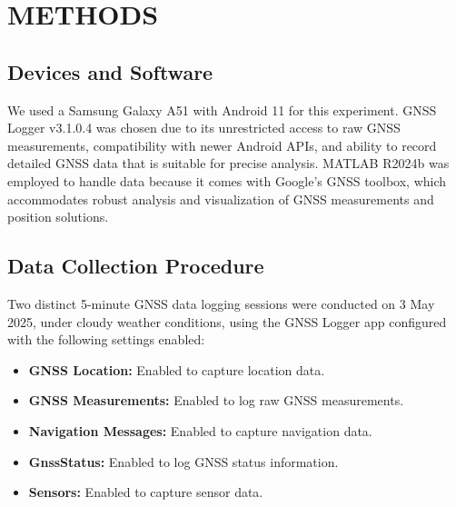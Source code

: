 
\section{METHODS} \label{sec:methods}


    \subsection{Devices and Software}
    
    We used a Samsung Galaxy A51 with Android 11 for this experiment.
    GNSS Logger v3.1.0.4 was chosen due to its unrestricted access to raw GNSS measurements, compatibility with newer Android APIs, and ability to record detailed GNSS data that is suitable for precise analysis.
    MATLAB R2024b was employed to handle data because it comes with Google's GNSS toolbox, which accommodates robust analysis and visualization of GNSS measurements and position solutions.
        
    \subsection{Data Collection Procedure}
    
        Two distinct 5-minute GNSS data logging sessions were conducted on 3 May 2025, under cloudy weather conditions, using the GNSS Logger app configured with the following settings enabled:

        \begin{itemize}
            \item \textbf{GNSS Location:} Enabled to capture location data.
            \item \textbf{GNSS Measurements:} Enabled to log raw GNSS measurements.
            \item \textbf{Navigation Messages:} Enabled to capture navigation data.
            \item \textbf{GnssStatus:} Enabled to log GNSS status information.
            \item \textbf{Sensors:} Enabled to capture sensor data.
        \end{itemize}
        
